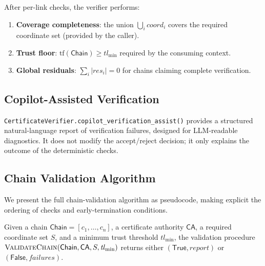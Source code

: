 \documentclass[11pt]{article}
\newcommand{\Chain}{\mathsf{Chain}}            %
\newcommand{\CA}{\mathsf{CA}}                  %
\newcommand{\certcoord}{\mathit{coord}}        %
\newcommand{\certtrust}{\mathit{tl}}           %
\newcommand{\certresid}{\mathit{res}}          %
\begin{document}
After per-link checks, the verifier performs:
\begin{enumerate}[leftmargin=2em,label=(\roman*)]
  \item \textbf{Coverage completeness}: the union $\bigcup_i \certcoord_i$
        covers the required coordinate set (provided by the caller).
  \item \textbf{Trust floor}: $\mathrm{tf}(\Chain) \ge \certtrust_{\min}$
        required by the consuming context.
  \item \textbf{Global residuals}: $\sum_i |\certresid_i| = 0$ for chains
        claiming complete verification.
\end{enumerate}

\subsection{Copilot-Assisted Verification}

\texttt{CertificateVerifier.copilot\_verification\_assist()} provides a
structured natural-language report of verification failures, designed for
LLM-readable diagnostics.  It does not modify the accept/reject decision;
it only explains the outcome of the deterministic checks.

\subsection{Chain Validation Algorithm}\label{sec:chain-val-alg}

We present the full chain-validation algorithm as pseudocode, making
explicit the ordering of checks and early-termination conditions.

\begin{definition}\label{def:chain-val}
Given a chain $\Chain = [c_1, \ldots, c_n]$, a certificate authority $\CA$,
a required coordinate set $S$, and a minimum trust threshold
$\certtrust_{\min}$, the validation procedure
$\textsc{ValidateChain}(\Chain, \CA, S, \certtrust_{\min})$
returns either $(\mathsf{True}, \mathit{report})$ or
$(\mathsf{False}, \mathit{failures})$.
\end{definition}
\end{document}
